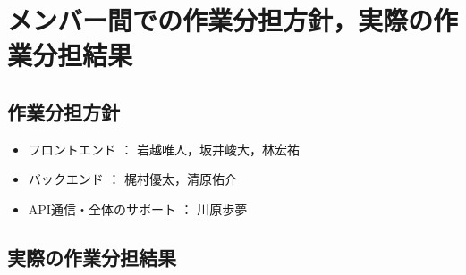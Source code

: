 \documentclass[a4j, titlepage]{jarticle}
\begin{document}
\section{メンバー間での作業分担方針，実際の作業分担結果}

\subsection{作業分担方針}
\begin{itemize}
\item フロントエンド ： 岩越唯人，坂井峻大，林宏祐
\item バックエンド ： 梶村優太，清原佑介
\item API通信・全体のサポート ： 川原歩夢
\end{itemize}

\subsection{実際の作業分担結果}
\end{document}
